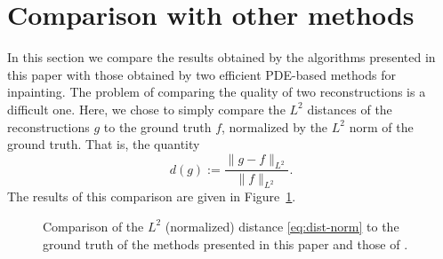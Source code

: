 \documentclass[proc]{edpsmath}
\begin{document}
{\color{blue}
\section{Comparison with other methods}

In this section we compare the results obtained by the algorithms presented in this paper with those obtained by two efficient PDE-based methods for inpainting. The problem of comparing the quality of two reconstructions is a difficult one. Here, we chose to simply compare the $L^2$ distances of the reconstructions $g$ to the ground truth $f$, normalized by the $L^2$ norm of the ground truth. That is, the quantity
\begin{equation}\label{eq:dist-norm}
  d( g):= \frac{ \|g-f\|_{L^2}}{\|f\|_{L^2}}.
\end{equation}
The results of this comparison are given in Figure~\ref{fig:comparison-facciolo}.

\begin{figure}
  \caption{Comparison of the $L^2$ (normalized) distance \eqref{eq:dist-norm} to the ground truth of the methods presented in this paper and those of \cite{cao,Facciolo}.}
  \label{fig:comparison-facciolo}
\end{figure}
}
\end{document}
